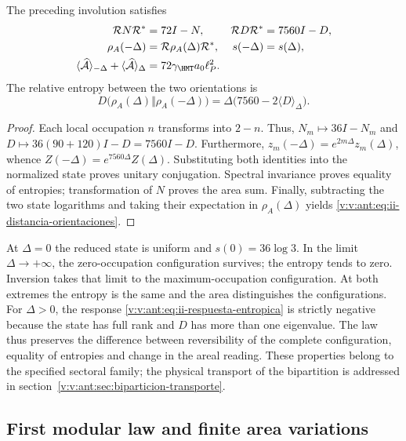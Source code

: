 \begin{theorem}
The preceding involution satisfies
\begin{align}
 \mathcal R N\mathcal R^*&=72I-N,&
 \mathcal R D\mathcal R^*&=7560I-D,\\
 \rho_A(-\Delta)&=\mathcal R\rho_A(\Delta)\mathcal R^*,&
 s(-\Delta)&=s(\Delta),
 \label{v:v:ant:eq:ii-inversion-entropia}\\
 \langle\widehat{\mathcal A}\rangle_{-\Delta}
 +\langle\widehat{\mathcal A}\rangle_\Delta
 &=72\gamma_{\HMT}a_0\ell_P^2.&&
 \label{v:v:ant:eq:ii-area-complementaria}
\end{align}
The relative entropy between the two orientations is
\begin{equation}
 D\bigl(\rho_A(\Delta)\Vert\rho_A(-\Delta)\bigr)
 =\Delta\bigl(7560-2\langle D\rangle_\Delta\bigr).
 \label{v:v:ant:eq:ii-distancia-orientaciones}
\end{equation}
\end{theorem}
\begin{proof}
Each local occupation $n$ transforms into $2-n$. Thus,
$N_m\mapsto36I-N_m$ and
$D\mapsto36(90+120)I-D=7560I-D$.
Furthermore, $z_m(-\Delta)=e^{2m\Delta}z_m(\Delta)$,
whence $Z(-\Delta)=e^{7560\Delta}Z(\Delta)$.
Substituting both identities into the normalized state proves
unitary conjugation. Spectral invariance proves equality
of entropies; transformation of $N$ proves the area sum.
Finally, subtracting the two state logarithms and taking
their expectation in $\rho_A(\Delta)$ yields
\eqref{v:v:ant:eq:ii-distancia-orientaciones}.
\end{proof}

At $\Delta=0$ the reduced state is uniform and
$s(0)=36\log3$. In the limit $\Delta\to+\infty$, the zero-occupation
configuration survives; the entropy tends to zero.
Inversion takes that limit to the maximum-occupation configuration.
At both extremes the entropy is the same and the area distinguishes the
configurations. For $\Delta>0$, the response
\eqref{v:v:ant:eq:ii-respuesta-entropica} is strictly negative because
the state has full rank and $D$ has more than one eigenvalue.
The law thus preserves the difference between reversibility of the
complete configuration, equality of entropies and change in the areal reading.
These properties belong to the specified sectoral family;
the physical transport of the bipartition is addressed in
section~\ref{v:v:ant:sec:biparticion-transporte}.

\subsection{First modular law and finite area variations}
\label{v:v:ant:sec:ii-area-ley-modular}

